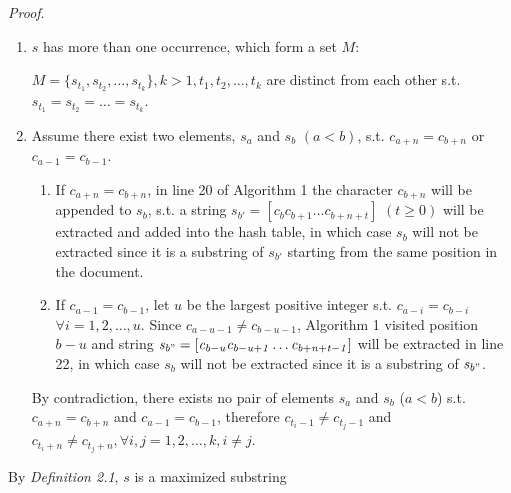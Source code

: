 \documentclass[english]{jnlp_1.4}
\begin{document}
{\it Proof}.
\begin{enumerate}
\item $s$ has more than one occurrence, which form a set $M$:

$M=\{\mathit{s_{t_1}},\mathit{s_{t_2}},\ldots,\mathit{s_{t_k}}\}, k>1, \mathit{t_1},\mathit{t_2},\ldots,\mathit{t_k}$ are distinct from each other s.t. $\mathit{s_{t_1}}=\mathit{s_{t_2}}=\ldots=\mathit{s_{t_k}}$. 

\item Assume there exist two elements,  $\mathit{s_a}$ and $\mathit{s_b}$ $(a<b)$, s.t. 
$\mathit{c_{a+n}} = \mathit{c_{b+n}}$ or $\mathit{c_{a-1}} = \mathit{c_{b-1}}$.
 
\begin{enumerate}
\item If $\mathit{c_{a+n}} = \mathit{c_{b+n}}$,  in line 20 of Algorithm 1 the character $\mathit{c_{b+n}}$ will be appended to 
$\mathit{s_b}$, s.t. a string $\mathit{s_{b'}}=[\mathit{c_{b}}\mathit{c_{b+1}}\ldots\mathit{c_{b+n+t}}]$ $(t \geq 0)$ will be extracted and added into the hash table, in which case $\mathit{s_b}$ will not be extracted since it is a substring of 
$\mathit{s_{b'}}$ starting from the same position in the document.

\item If $\mathit{c_{a-1}} = \mathit{c_{b-1}}$, let $u$ be the largest positive integer s.t. 
$\mathit{c_{a-i}} = \mathit{c_{b-i}}$ $\forall i=1,2,\ldots,u$. 
Since $\mathit{c_{a-u-1}} \neq \mathit{c_{b-u-1}}$, Algorithm 1 visited position  $b-u$ and string $\mathit{s_{b"}}=[\mathit{c_{b-u}}\mathit{c_{b-u+1}}\ldots\mathit{c_{b+n+t-1}}]$ will be extracted in line 22, in which case $\mathit{s_{b}}$ will not be extracted since it is a substring of $\mathit{s_{b"}}$.
\end{enumerate}
By contradiction, there exists no pair of elements $\mathit{s_{a}}$ and $\mathit{s_{b}}$ ($a<b$) s.t. 
$\mathit{c_{a+n}}=\mathit{c_{b+n}}$ and $\mathit{c_{a-1}}=\mathit{c_{b-1}}$, 
therefore $\mathit{c_{t_i-1}}\neq\mathit{c_{t_j-1}}$ and $\mathit{c_{t_i+n}}\neq\mathit{c_{t_j+n}}, \forall \mathit{i},\mathit{j}=1,2,\ldots,k, \mathit{i}\neq\mathit{j}$.
\end{enumerate}

By {\it Definition 2.1}, $s$ is a maximized substring
\end{document}
